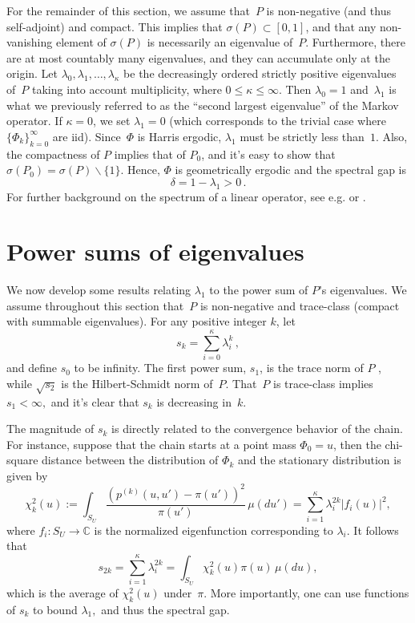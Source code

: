 \documentclass[11pt]{article}
\begin{document}
	For the remainder of this section, we assume that~$P$ is
        non-negative (and thus self-adjoint) and compact.  This
        implies that $\sigma(P) \subset [0,1]$, and that any
        non-vanishing element of $\sigma(P)$ is necessarily an
        eigenvalue of~$P$.  Furthermore, there are at most countably
        many eigenvalues, and they can accumulate only at the
        origin. Let $\lambda_0, \lambda_1, \dots, \lambda_{\kappa}$ be
        the decreasingly ordered strictly positive eigenvalues of~$P$
        taking into account multiplicity, where $0 \leq \kappa \leq
        \infty$. Then $\lambda_0=1$ and~$\lambda_1$ is what we
        previously referred to as the ``second largest eigenvalue'' of
        the Markov operator.  If $\kappa = 0$, we set $\lambda_1 = 0$
        (which corresponds to the trivial case where
        $\{\Phi_k\}_{k=0}^{\infty}$ are iid). Since~$\Phi$ is Harris
        ergodic, $\lambda_1$ must be strictly less than~$1$.  Also,
        the compactness of $P$ implies that of $P_0$, and it's easy to
        show that $\sigma(P_0) = \sigma(P) \backslash \{1\}$.  Hence,
        $\Phi$ is geometrically ergodic and the spectral gap is
	\[
	\delta = 1-\lambda_1 > 0 \,.
	\]
	For further background on the spectrum of a linear operator,
        see e.g. \cite{helmberg2014introduction} or
        \cite{ahues2001spectral}.


	\section{Power sums of eigenvalues} \label{powersum}
	
	We now develop some results relating $\lambda_1$ to the power
        sum of $P$'s eigenvalues.  We assume throughout this section
        that~$P$ is non-negative and trace-class (compact with
        summable eigenvalues).  For any positive integer $k$, let
	\[
	s_k = \sum_{i=0}^{\kappa} \lambda_i^k \,,
	\]
	and define $s_0$ to be infinity. The first power sum, $s_1$,
        is the trace norm of $P$ \citep[see e.g.][]{conway1990course,
          conway2000course}, while $\sqrt{s_2}$ is the Hilbert-Schmidt
        norm of~$P.$ That~$P$ is trace-class implies $s_1 < \infty,$
        and it's clear that $s_k$ is decreasing in~$k.$ 
        
     The magnitude of $s_k$ is directly related to the convergence behavior of the chain. For instance, suppose that the chain starts at a point mass $\Phi_0 = u$, then the chi-square distance between the distribution of $\Phi_k$ and the stationary distribution is given by \citep[see e.g.][]{diaconis2008gibbs}
     \[
     \chi_k^2(u) := \int_{S_U} \frac{\left(p^{(k)}(u,u') - \pi(u') \right)^2}{\pi(u')} \, \mu(du') =  \sum_{i=1}^{\kappa} \lambda_i^{2k} |f_i(u)|^2,
     \]
     where $f_i: S_U \to \mathbb{C}$ is the normalized eigenfunction corresponding to $\lambda_i$. It follows that
     \[
     s_{2k} = \sum_{i=1}^{\kappa} \lambda_i^{2k} = \int_{S_U} \chi_k^2(u) \pi(u) \, \mu(du),
     \]
     which is the average of $\chi_k^2(u)$ under~$\pi.$ More importantly, one can use functions of $s_k$ to bound $\lambda_1,$ and thus the spectral gap.
	
\end{document}
